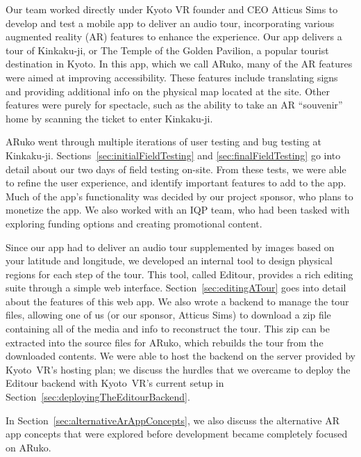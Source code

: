 \documentclass[a4paper, 10pt, american, titlepage]{article}
\begin{document}
Our team worked directly under Kyoto VR founder and CEO Atticus Sims to develop
and test a mobile app to deliver an audio tour, incorporating various
augmented reality (AR) features to enhance the experience. Our app delivers a
tour of Kinkaku-ji, or The Temple of the Golden Pavilion, a popular tourist
destination in Kyoto. In this app, which we call ARuko, many of the AR features
were aimed at improving accessibility. These features include translating signs
and providing additional info on the physical map located at the site. Other
features were purely for spectacle, such as the ability to take an AR
``souvenir'' home by scanning the ticket to enter Kinkaku-ji.

ARuko went through multiple iterations of user testing and bug testing at
Kinkaku-ji. Sections~\ref{sec:initialFieldTesting} and
\ref{sec:finalFieldTesting} go into detail about our two days of field testing
on-site. From these tests, we were able to refine the user experience, and
identify important features to add to the app. Much of the app's functionality
was decided by our project sponsor, who plans to monetize the app. We also
worked with an IQP team, who had been tasked with exploring funding options and
creating promotional content.

Since our app had to deliver an audio tour supplemented by images based on your
latitude and longitude, we developed an internal tool to design physical
regions for each step of the tour. This tool, called Editour, provides a rich
editing suite through a simple web interface. Section~\ref{sec:editingATour}
goes into detail about the features of this web app. We also wrote a backend to
manage the tour files, allowing one of us (or our sponsor, Atticus Sims) to
download a zip file containing all of the media and info to reconstruct the
tour. This zip can be extracted into the source files for ARuko, which rebuilds
the tour from the downloaded contents. We were able to host the backend on the
server provided by Kyoto~VR's hosting plan; we discuss the hurdles that we
overcame to deploy the Editour backend with Kyoto~VR's current setup in
Section~\ref{sec:deployingTheEditourBackend}.

In Section~\ref{sec:alternativeArAppConcepts}, we also discuss the alternative
AR app concepts that were explored before development became completely focused
on ARuko.

\clearpage

\begin{singlespace}
	\tableofcontents
	\clearpage

	\listoffigures
	\clearpage

	\listoftables
	\clearpage
\end{singlespace}
\end{document}
